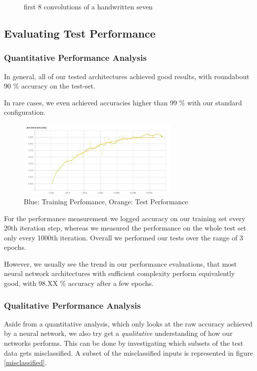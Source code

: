 \documentclass{article}
\begin{document}
\begin{figure}
\begin{tabular}{cc}
\end{tabular}
\caption{first 8 convolutions of a handwritten seven}\label{convout}
\end{figure}

\subsection{Evaluating Test Performance}
\subsubsection{Quantitative Performance Analysis}

In general, all of our tested architectures achieved good results, with roundabout 90 \% accuracy on the test-set.

In rare cases, we even achieved accuracies higher than 99 \% with our standard configuration.

\begin{figure}[h]
\centering
\includegraphics[width=0.7\textwidth]{imgs/acc_std.png}
\caption{Blue: Training Perfomance, Orange: Test Performance}
\end{figure}

For the performance measurement we logged accuracy on our training set every 20th iteration step, whereas we measured the performance on the whole test set only every 1000th iteration. Overall we performed our tests over the range of 3 epochs. 

However, we usually see the trend in our performance evaluations, that most neural network architectures with sufficient complexity perform equivalently good, with 98.XX \% accuracy after a few epochs.

\subsubsection{Qualitative Performance Analysis}

Aside from a quantitative analysis, which only looks at the raw accuracy achieved by a neural network, we also try get a \textit{qualitative} understanding of how our networks performs. This can be done by investigating which subsets of the test data gets misclassified. A subset of the misclassified inputs is represented in figure \ref{misclassified}.
\end{document}
